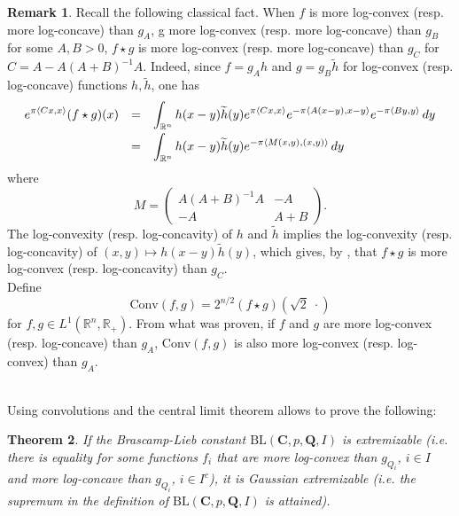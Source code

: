 \documentclass[11pt,a4paper,reqno]{amsart}
\numberwithin{equation}{section}
\newtheorem{theorem}{Theorem}[section]
\theoremstyle{definition}
\newtheorem{remark}[theorem]{Remark}
\newcommand{\nm}{\noalign{\smallskip}}
\newcommand{\ds}{\displaystyle}
\renewcommand{\tilde}{\widetilde}
\newcommand{\<}{\ensuremath \leq}
\renewcommand{\>}{\ensuremath \geq}
\renewcommand{\tilde}{\widetilde}
\begin{document}
\bigskip

\begin{remark}
 Recall the following classical fact. When $f$ is more log-convex (resp. more log-concave) than $g_A$, g more log-convex (resp. more log-concave) than $g_B$ for some $A,B>0$, $f \star g$ is more log-convex (resp. more log-concave) than $g_C$ for $C=A-A(A+B)^{-1}A$. Indeed, since $f=g_Ah$ and $g=g_B\tilde h$ for log-convex (resp. log-concave) functions $h, \tilde h$, one has $$\begin{array}{lll}
\ds e^{\pi \langle Cx,x \rangle}(f \star g)(x) &=& \ds \int_{\mathbb{R}^n} h(x-y)\tilde h(y) e^{\pi \langle Cx,x\rangle}e^{-\pi \langle A(x-y), x-y\rangle}e^{-\pi \langle By,y\rangle}\, dy \\
\nm 
&=& \ds \int_{\mathbb{R}^n}h(x-y)\tilde h(y) e^{-\pi \langle M(x,y),(x,y)\rangle}\, dy
\end{array}$$ where $$M=\begin{pmatrix}
    A(A+B)^{-1}A &  -A \\ 
   -A & A+B
\end{pmatrix}.$$ The log-convexity (resp. log-concavity) of $h$ and $\tilde h$ implies the log-convexity (resp. log-concavity) of $(x,y) \mapsto h(x-y)\tilde h(y)$, which gives, by \cite[Theorem 4.3]{Brascamp_Lieb}, that $f \star g$ is more log-convex (resp. log-concavity) than $g_C.$ 
\\ 
Define $$\mathrm{Conv}(f,g)=2^{n/2}(f \star g)(\sqrt{2}\;\cdot)$$ for $f,g \in L^1(\mathbb{R}^n,\mathbb{R}_+).$ From what was proven, if $f$ and $g$ are more log-convex (resp. log-concave) than $g_A$, $\mathrm{Conv}(f,g)$ is also more log-convex (resp. log-convex) than $g_A.$ 
\end{remark}

\hfill \\

Using convolutions and the central limit theorem allows to prove the following: 

\begin{theorem} \label{Ext_implies_Gaussian_ext}
If the Brascamp-Lieb constant $\mathrm{BL}(\textbf{C},p,\textbf{Q},I)$ is extremizable (\textit{i.e.} there is equality for some functions $f_i$ that are more log-convex than $g_{Q_i}$, $i \in  I$ and more log-concave than $g_{Q_i}$, $i \in I^c$), it is Gaussian extremizable (\textit{i.e.} the supremum in the definition of $\mathrm{BL}(\textbf{C},p,\textbf{Q},I)$ is attained). 
\end{theorem}
\end{document}
